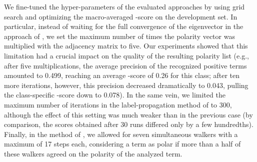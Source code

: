 We fine-tuned the hyper-parameters of the evaluated approaches by
using grid search and optimizing the macro-averaged \F{}-score on the
development set.  In particular, instead of waiting for the full
convergence of the eigenvector in the approach of
\citet{Blair-Goldensohn:08}, we set the maximum number of times the
polarity vector was multiplied with the adjacency matrix to five.  Our
experiments showed that this limitation had a crucial impact on the
quality of the resulting polarity list (e.g., after five
multiplications, the average precision of the recognized positive
terms amounted to 0.499, reaching an average \F{}-score of 0.26 for
this class; after ten more iterations, however, this precision
decreased dramatically to 0.043, pulling the class-specific \F{}-score
down to 0.078).  In the same vein, we limited the maximum number of
iterations in the label-propagation method of \citet{Rao:09} to 300,
although the effect of this setting was much weaker than in the
previous case (by comparison, the scores obtained after 30 runs
differed only by a few hundredths).  Finally, in the method of
\citet{Awadallah:10}, we allowed for seven simultaneous walkers with a
maximum of 17 steps each, considering a term as polar if more than a
half of these walkers agreed on the polarity of the analyzed term.

